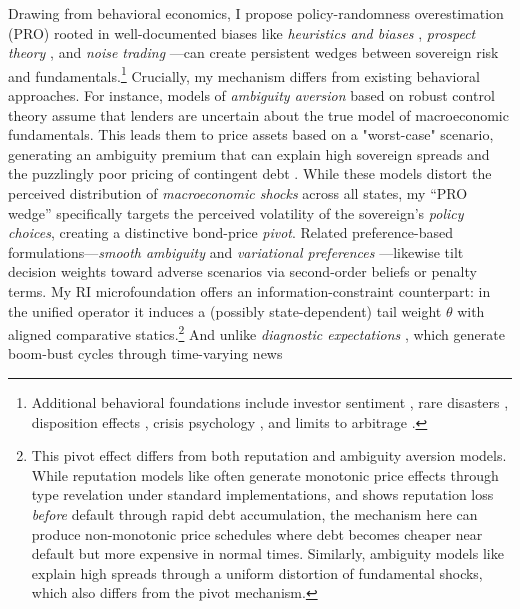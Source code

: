 \documentclass[12pt]{article}
\theoremstyle{plain}
\begin{document}
Drawing from behavioral economics, I propose policy-randomness overestimation
(PRO) rooted in well-documented biases like \textit{heuristics and biases}
\citet{TverskyKahneman1974}, \textit{prospect theory}
\citet{KahnemanTversky1979}, and \textit{noise trading}
\citet{DeLongEtAl1990}---can create persistent wedges between sovereign risk
and fundamentals.\footnote{Additional behavioral foundations include investor
	sentiment \citet{BakerWurgler2006}, rare disasters \citet{Gabaix2012},
	disposition effects \citet{ShefrinStatman1985}, crisis psychology
	\citet{Kindleberger1978}, and limits to arbitrage \citet{BrunnermeierNagel2004,
		BarberisThaler2003}.} Crucially, my mechanism differs from existing behavioral
approaches. For instance, models of \textit{ambiguity aversion} based on robust
control theory \citet{GilboaSchmeidler1989, HansenSargent2008} assume that
lenders are uncertain about the true model of macroeconomic fundamentals. This
leads them to price assets based on a "worst-case" scenario, generating an
ambiguity premium that can explain high sovereign spreads
\citet{PouzoPresno2016} and the puzzlingly poor pricing of contingent debt
\citet{RochRoldan2023}. While these models distort the perceived distribution
of \textit{macroeconomic shocks} across all states, my ``PRO wedge''
specifically targets the perceived volatility of the sovereign's \textit{policy
	choices}, creating a distinctive bond-price \textit{pivot}. Related
preference-based formulations---\textit{smooth ambiguity}
\citet{KlibanoffMarinacciMukerji2005} and \textit{variational preferences}
\citet{MaccheroniMarinacciRustichini2006}---likewise tilt decision weights
toward adverse scenarios via second-order beliefs or penalty terms. My RI
microfoundation offers an information-constraint counterpart: in the unified
operator it induces a (possibly state-dependent) tail weight $\theta$ with
aligned comparative statics.\footnote{This pivot effect differs from both
	reputation and ambiguity aversion models. While reputation models like
	\citet{AmadorPhelan2021} often generate monotonic price effects through type
	revelation under standard implementations, and \citet{Fourakis2021} shows
	reputation loss \textit{before} default through rapid debt accumulation, the
	mechanism here can produce non-monotonic price schedules where debt becomes
	cheaper near default but more expensive in normal times. Similarly, ambiguity
	models like \citet{RochRoldan2023} explain high spreads through a uniform
	distortion of fundamental shocks, which also differs from the pivot mechanism.}
And unlike \textit{diagnostic expectations} \citet{GennaioliShleifer2018,
	BordaloEtAl2023}, which generate boom-bust cycles through time-varying news
\end{document}
